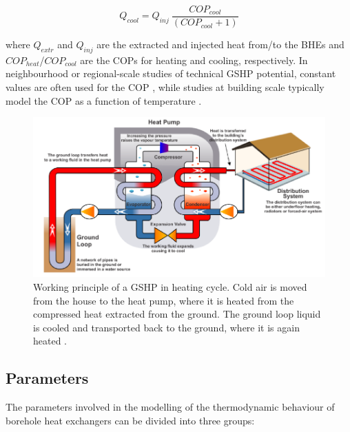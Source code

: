 \begin{equation}
\label{eq:COP_cool}
Q_\mathit{cool}=Q_\mathit{inj}\ \frac{COP_\mathit{cool}}{\left(COP_\mathit{cool}+1\right)}
\end{equation}

where $Q_\mathit{extr}$ and $Q_\mathit{inj}$ are the extracted and injected heat from/to the BHEs and $COP_\mathit{heat}$/$COP_\mathit{cool}$ are the COPs for heating and cooling, respectively. In neighbourhood or regional-scale studies of technical GSHP potential, constant values are often used for the COP \cite{miglani_methodology_2018,schiel_gis-based_2016,perego_techno-economic_2019}, while studies at building scale typically model the COP as a function of temperature \cite{fraga_heat_2018,liu_feasibility_2017,stene_residential_2005}.

\begin{figure}[bt]
    \centering
    \includegraphics[width=0.7\linewidth]{images/Figs/GSHP.png}
    \caption{Working principle of a GSHP in heating cycle. Cold air is moved from the house to the heat pump, where it is heated from the compressed heat extracted from the ground. The ground loop liquid is cooled and transported back to the ground, where it is again heated \cite{gns_science_n.z._geothermal_2016}.}
    \label{fig:HP}
\end{figure}

\subsection{Parameters}
\label{geo_params}
The parameters involved in the modelling of the thermodynamic behaviour of borehole heat exchangers can be divided into three groups: 

